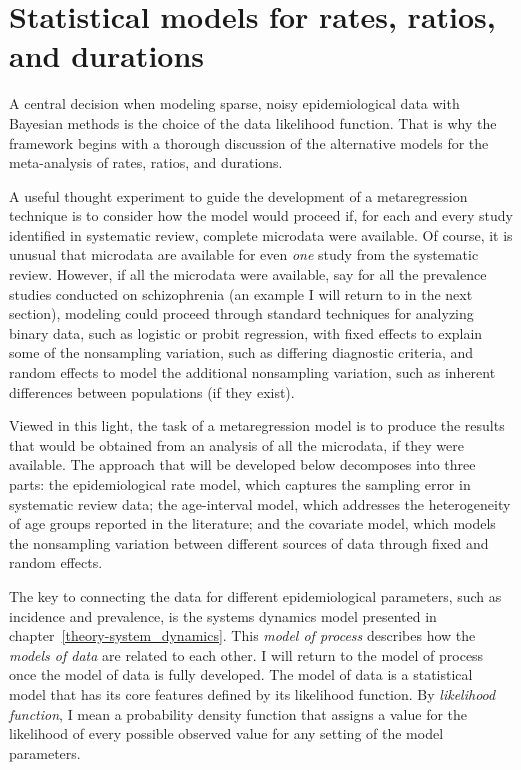 \chapter{Statistical models for rates, ratios, and durations}
\label{theory-rate_model}

A central decision when modeling sparse, noisy epidemiological data
with Bayesian methods is the choice of the data likelihood function.
That is why the framework begins with a thorough discussion of the
alternative models for the meta-analysis of rates, ratios, and
durations.

A useful thought experiment to guide the development of
a metaregression technique is to consider how the model would proceed
if, for each and every study identified in systematic review, complete
microdata were available.  Of course, it is unusual that microdata are
available for even \emph{one} study from the systematic review.  However,
if all the microdata were available, say for all the prevalence
studies conducted on schizophrenia (an example I will return to in
the next section), modeling could proceed through standard techniques
for analyzing binary data, such as logistic or probit regression, with
fixed effects to explain some of the nonsampling variation, such as
differing diagnostic criteria, and random effects to model the
additional nonsampling variation, such as inherent differences
between populations (if they exist).

Viewed in this light, the task of a metaregression model is to
produce the results that would be obtained from an analysis of all the
microdata, if they were available. The approach that will be
developed below decomposes into three parts: the epidemiological rate
model, which captures the sampling error in systematic review data;
the age-interval model, which addresses the heterogeneity of age groups
reported in the literature; and the covariate model, which
models the nonsampling variation between different sources of data
through fixed and random effects.

The key to connecting the data for different epidemiological
parameters, such as incidence and prevalence, is the systems dynamics
model presented in chapter~\ref{theory-system_dynamics}.  This \emph{model of
  process} describes how the \emph{models of data} are related to each
other.  I will return to the model of process once the model of data
is fully developed.  The model of data is a statistical model that
has its core features defined by its likelihood function.  By
\emph{likelihood function}, I mean a probability density function that
assigns a value for the likelihood of every possible observed value
for any setting of the model parameters.

